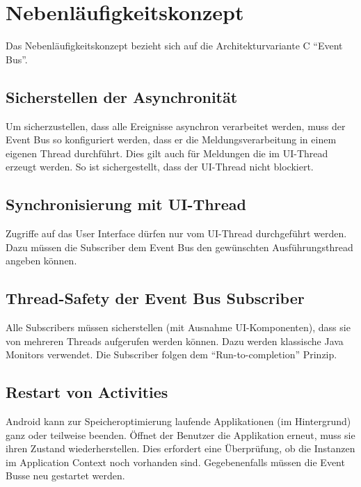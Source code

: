 \section{Nebenläufigkeitskonzept}
\label{sec:Nebenläufigkeitskonzept}
Das Nebenläufigkeitskonzept bezieht sich auf die Architekturvariante C \enquote{Event Bus}.

\subsection{Sicherstellen der Asynchronität}
Um sicherzustellen, dass alle Ereignisse asynchron verarbeitet werden, muss der Event Bus so konfiguriert werden, dass er die Meldungsverarbeitung in einem eigenen Thread durchführt. Dies gilt auch für Meldungen die im \ac{UI}-Thread erzeugt werden. So ist sichergestellt, dass der \ac{UI}-Thread nicht blockiert.

\subsection{Synchronisierung mit \ac{UI}-Thread}
Zugriffe auf das User Interface dürfen nur vom UI-Thread durchgeführt werden. Dazu müssen die Subscriber dem Event Bus den gewünschten Ausführungsthread angeben können.

\subsection{Thread-Safety der Event Bus Subscriber}
Alle Subscribers müssen sicherstellen (mit Ausnahme UI-Komponenten), dass sie von mehreren Threads aufgerufen werden können. Dazu werden klassische Java Monitors verwendet. Die Subscriber folgen dem \enquote{Run-to-completion} Prinzip.

\subsection{Restart von Activities}
Android kann zur Speicheroptimierung laufende Applikationen (im Hintergrund) ganz oder teilweise beenden. Öffnet der Benutzer die Applikation erneut, muss sie ihren Zustand wiederherstellen. Dies erfordert eine Überprüfung, ob die Instanzen im Application Context noch vorhanden sind. Gegebenenfalls müssen die Event Busse neu gestartet werden.